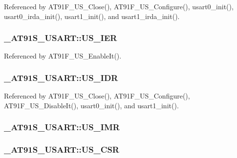 Referenced by AT91F\_\-US\_\-Close(), AT91F\_\-US\_\-Configure(), usart0\_\-init(), usart0\_\-irda\_\-init(), usart1\_\-init(), and usart1\_\-irda\_\-init().\hypertarget{struct__AT91S__USART_32f11fc267293f03d51a7f7e9435f9f7}{
\subsubsection{ {\bf \_\-AT91S\_\-USART::US\_\-IER}}}
\label{struct__AT91S__USART_32f11fc267293f03d51a7f7e9435f9f7}




Referenced by AT91F\_\-US\_\-EnableIt().\hypertarget{struct__AT91S__USART_cdccf0e5fc2b85fa777ac58a968139b7}{
\subsubsection{ {\bf \_\-AT91S\_\-USART::US\_\-IDR}}}
\label{struct__AT91S__USART_cdccf0e5fc2b85fa777ac58a968139b7}




Referenced by AT91F\_\-US\_\-Close(), AT91F\_\-US\_\-Configure(), AT91F\_\-US\_\-DisableIt(), usart0\_\-init(), and usart1\_\-init().\hypertarget{struct__AT91S__USART_d9c73a10ef0097e1f414c55091b77b10}{
\subsubsection{ {\bf \_\-AT91S\_\-USART::US\_\-IMR}}}
\label{struct__AT91S__USART_d9c73a10ef0097e1f414c55091b77b10}


\hypertarget{struct__AT91S__USART_d6d83c447c95577160767aeea0f1a404}{
\subsubsection{ {\bf \_\-AT91S\_\-USART::US\_\-CSR}}}
\label{struct__AT91S__USART_d6d83c447c95577160767aeea0f1a404}




